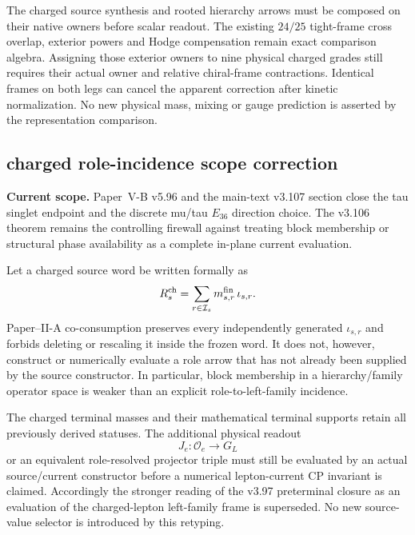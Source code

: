 \documentclass[12pt,a4paper]{article}
\begin{document}
The charged source synthesis and rooted hierarchy arrows must be composed
on their native owners before scalar readout. The existing $24/25$
tight-frame cross overlap, exterior powers and Hodge compensation remain
exact comparison algebra. Assigning those exterior owners to nine
physical charged grades still requires their actual owner and relative
chiral-frame contractions. Identical frames on both legs can cancel the
apparent correction after kinetic normalization. No new physical mass,
mixing or gauge prediction is asserted by the representation comparison.


\subsection*{charged role-incidence scope correction}
\label{p5:sec:v3106-charged-role-incidence-scope}
\noindent\textbf{Current scope.} Paper~V-B v5.96 and the main-text v3.107 section close the tau singlet endpoint and the discrete mu/tau $E_{36}$ direction choice.  The v3.106 theorem remains the controlling firewall against treating block membership or structural phase availability as a complete in-plane current evaluation.

\begin{theorem}
\label{p5:thm:v3106-symbolic-incidence-not-evaluation}
Let a charged source word be written formally as
\[
 R_s^{\rm ch}=\sum_{r\in\mathcal I_s}m^{\rm fin}_{s,r}\,\iota_{s,r}.
\]
Paper--II-A co-consumption preserves every independently generated
$\iota_{s,r}$ and forbids deleting or rescaling it inside the frozen word.
It does not, however, construct or numerically evaluate a role arrow that has
not already been supplied by the source constructor.  In particular, block
membership in a hierarchy/family operator space is weaker than an explicit
role-to-left-family incidence.
\end{theorem}

\begin{corollary}
\label{p5:cor:v3106-charged-lepton-incidence-frontier}
The charged terminal masses and their mathematical terminal supports retain
all previously derived statuses.  The additional physical readout
\[
 J_e:\mathcal O_e\longrightarrow G_L
\]
or an equivalent role-resolved projector triple must still be evaluated by
an actual source/current constructor before a numerical lepton-current CP
invariant is claimed.  Accordingly the stronger reading of the v3.97
preterminal closure as an evaluation of the charged-lepton left-family frame
is superseded.  No new source-value selector is introduced by this
retyping.
\end{corollary}
\end{document}
